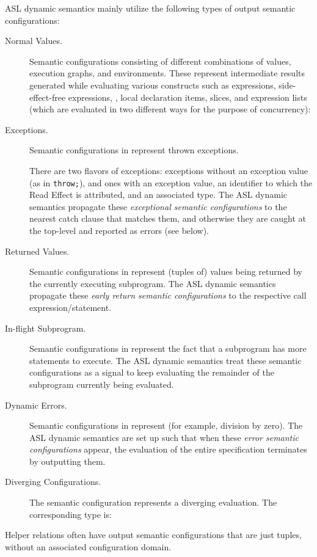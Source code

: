 ASL dynamic semantics mainly utilize the following types of output semantic configurations:
\begin{description}
  \item[Normal Values.]\hypertarget{def-normal}{}
  Semantic configurations consisting of different combinations of values,
  execution graphs, and environments. These represent intermediate results
  generated while evaluating various constructs such as
  expressions, side-effect-free expressions, \assignableexpressions,
  local declaration items, slices, and expression lists
  (which are evaluated in two different ways for the purpose of concurrency):

  \item[Exceptions.] Semantic configurations in  represent thrown exceptions.

  There are two flavors of exceptions:
  exceptions without an exception value (as in \texttt{throw;}), and ones with an exception value,
  an identifier to which the Read Effect is attributed, and an associated type.
  The ASL dynamic semantics propagate these \emph{exceptional semantic configurations} to the nearest catch clause that matches
  them, and otherwise they are caught at the top-level and reported as errors (see \dynamicerrorsterm{} below).

  \item[Returned Values.] Semantic configurations in 
  represent (tuples of) values being returned by the currently executing subprogram.
  The ASL dynamic semantics propagate these \emph{early return semantic configurations} to the respective call expression/statement.

  \item[In-flight Subprogram.] Semantic configurations in 
  represent the fact that a subprogram has more statements to execute.
  The ASL dynamic semantics treat these semantic configurations as a signal to keep evaluating the remainder
  of the subprogram currently being evaluated.

  \item[Dynamic Errors.] Semantic configurations in
  represent \dynamicerrorsterm{} (for example, division by zero).
  The ASL dynamic semantics are set up such that when these \emph{error semantic configurations} appear,
  the evaluation of the entire specification terminates by outputting them.

  \item[Diverging Configurations.] The semantic configuration 
  represents a diverging evaluation.
  The corresponding type is:

\end{description}
Helper relations often have output semantic configurations that are just tuples, without an associated configuration domain.

